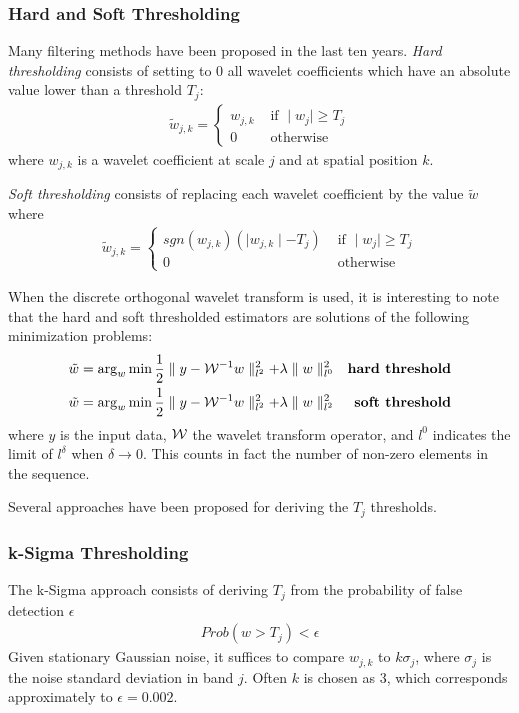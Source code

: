 \begin{itemize}
\subsubsection*{Hard and Soft Thresholding}
Many filtering methods have been proposed in the last ten years.
{\em Hard thresholding} consists of setting to 0 all 
wavelet coefficients which have an absolute
value lower than a threshold $T_j$:
\begin{eqnarray}  \tilde w_{j,k} = 
\left\{ \begin{array}{ll} w_{j,k} &  \mbox{ if } \mid w_j \mid \geq T_j  \nonumber  \\ 

0 &  \mbox{ otherwise}  \end{array} \right. 
\end{eqnarray}
where $w_{j,k}$ is a wavelet coefficient at scale $j$ and at spatial
position $k$. 

{\em Soft thresholding} consists of replacing each wavelet coefficient
by the value $\tilde w$ where
\begin{eqnarray}  \tilde w_{j,k} = 
\left\{ \begin{array}{ll} sgn(w_{j,k}) ( \mid w_{j,k} \mid - T_j)    &  \mbox{ if } \mid w_j \mid \geq T_j \nonumber  \\ 
0 &  \mbox{ otherwise}  \end{array} \right. 
\end{eqnarray} 

When the discrete orthogonal wavelet transform is used, it is interesting 
to note
that the hard and soft thresholded estimators are solutions of the following
minimization problems:
\begin{eqnarray*}
  \tilde w  =   \mathrm{arg}_w \min \frac{1}{2} \parallel y - {\cal W}^{-1} w \parallel^2_{l^2} + 
 \lambda \parallel w \parallel^2_{l^0} & & \mbox{\bf   hard threshold} \nonumber \\
  \tilde w   =   \mathrm{arg}_w \min \frac{1}{2} \parallel y - {\cal W}^{-1} w \parallel^2_{l^2} + 
 \lambda \parallel w \parallel^2_{l^2} & & \mbox{\bf   soft threshold}  
\end{eqnarray*}
where $y$ is the input data, ${\cal W}$ the wavelet transform operator, and
$l^0$ indicates the limit of $l^\delta$ when $\delta \rightarrow 0$. This 
counts in fact the number of non-zero elements in the sequence.

Several approaches have been proposed for deriving the $T_j$ thresholds. 


\subsubsection*{k-Sigma Thresholding}
The k-Sigma approach consists of deriving $T_j$ from the probability 
of false detection $\epsilon$  
\begin{eqnarray*}
Prob(w > T_j) < \epsilon 
\end{eqnarray*}
Given stationary Gaussian noise, it suffices to compare $w_{j,k}$ to 
$k \sigma_j$, where $\sigma_j$ is the noise standard deviation in band $j$.  
Often $k $ is chosen as 3, which corresponds approximately 
to $\epsilon = 0.002$.   


\end{itemize}
